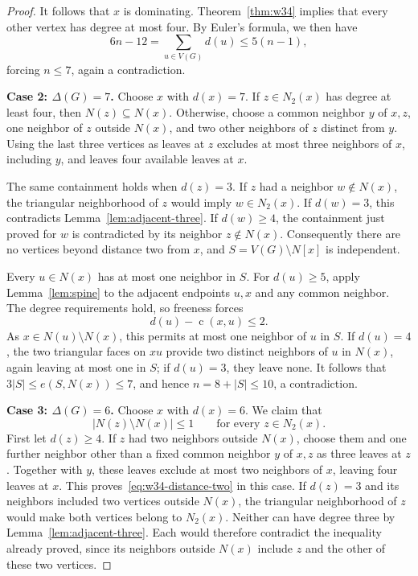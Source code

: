 \documentclass[11pt,a4paper]{article}
\theoremstyle{remark}
\newcommand{\cdeg}{\operatorname{c}}
\begin{document}
\begin{proof}
It follows that $x$ is dominating. Theorem~\ref{thm:w34} implies
that every other vertex has degree at most four. By Euler's formula,
we then have
\[
6n-12=\sum_{u\in V(G)}d(u)\le5(n-1),
\]
forcing $n\le7$, again a contradiction.

\medskip\noindent
\textbf{Case 2: $\Delta(G)=7$.}
Choose $x$ with $d(x)=7$. If $z\in N_2(x)$ has degree at least
four, then $N(z)\subseteq N(x)$. Otherwise, choose a common
neighbor $y$ of $x,z$, one neighbor of $z$ outside $N(x)$, and
two other neighbors of $z$ distinct from $y$. Using the last three
vertices as leaves at $z$ excludes at most three neighbors of $x$,
including $y$, and leaves four available leaves at $x$.

The same containment holds when $d(z)=3$. If $z$ had a neighbor
$w\notin N(x)$, the triangular neighborhood of $z$ would imply
$w\in N_2(x)$. If $d(w)=3$, this contradicts
Lemma~\ref{lem:adjacent-three}. If $d(w)\ge4$, the containment
just proved for $w$ is contradicted by its neighbor $z\notin N(x)$.
Consequently there are no vertices beyond distance two from $x$,
and $S=V(G)\setminus N[x]$ is independent.

Every $u\in N(x)$ has at most one neighbor in $S$. For $d(u)\ge5$,
apply Lemma~\ref{lem:spine} to the adjacent endpoints $u,x$ and
any common neighbor. The degree requirements hold, so freeness
forces
\[
d(u)-\cdeg(x,u)\le2.
\]
As $x\in N(u)\setminus N(x)$, this permits at most one neighbor
of $u$ in $S$. If $d(u)=4$, the two triangular faces on $xu$
provide two distinct neighbors of $u$ in $N(x)$, again leaving at
most one in $S$; if $d(u)=3$, they leave none. It follows that
$3|S|\le e(S,N(x))\le7$, and hence $n=8+|S|\le10$, a contradiction.

\medskip\noindent
\textbf{Case 3: $\Delta(G)=6$.}
Choose $x$ with $d(x)=6$. We claim that
\begin{equation}\label{eq:w34-distance-two}
|N(z)\setminus N(x)|\le1
\qquad\text{for every }z\in N_2(x).
\end{equation}
First let $d(z)\ge4$. If $z$ had two neighbors outside $N(x)$,
choose them and one further neighbor other than a fixed common
neighbor $y$ of $x,z$ as three leaves at $z$. Together with $y$,
these leaves exclude at most two neighbors of $x$, leaving four
leaves at $x$. This proves~\eqref{eq:w34-distance-two} in this
case. If $d(z)=3$ and its neighbors included two vertices outside
$N(x)$, the triangular neighborhood of $z$ would make both
vertices belong to $N_2(x)$. Neither can have degree three by
Lemma~\ref{lem:adjacent-three}. Each would therefore contradict
the inequality already proved, since its neighbors outside
$N(x)$ include $z$ and the other of these two vertices.


\end{proof}
\end{document}
